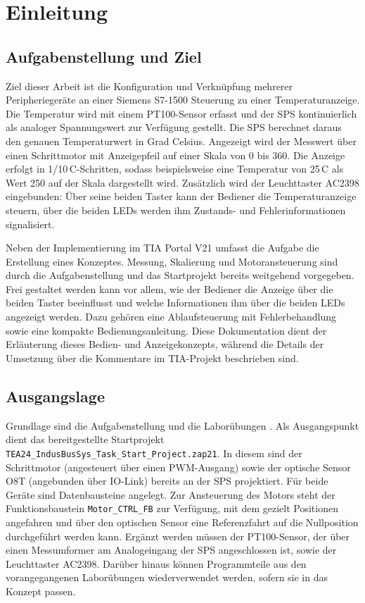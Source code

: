 \section{Einleitung}

\subsection{Aufgabenstellung und Ziel}
Ziel dieser Arbeit ist die Konfiguration und Verknüpfung mehrerer Peripheriegeräte an einer Siemens S7-1500 Steuerung zu einer Temperaturanzeige. 
Die Temperatur wird mit einem PT100-Sensor erfasst und der SPS kontinuierlich als analoger Spannungswert zur Verfügung gestellt. Die SPS berechnet daraus den genauen Temperaturwert in Grad Celsius. 
Angezeigt wird der Messwert über einen Schrittmotor mit Anzeigepfeil auf einer Skala von 0 bis 360. 
Die Anzeige erfolgt in 1/10\,\textdegree C-Schritten, sodass beispielsweise eine Temperatur von 25\,\textdegree C als Wert 250 auf der Skala dargestellt wird. 
Zusätzlich wird der Leuchttaster AC2398 eingebunden: Über seine beiden Taster kann der Bediener die Temperaturanzeige steuern, über die beiden LEDs werden ihm Zustands- und Fehlerinformationen signalisiert.

Neben der Implementierung im TIA Portal V21 umfasst die Aufgabe die Erstellung eines Konzeptes. 
Messung, Skalierung und Motoransteuerung sind durch die Aufgabenstellung und das Startprojekt bereits weitgehend vorgegeben. 
Frei gestaltet werden kann vor allem, wie der Bediener die Anzeige über die beiden Taster beeinflusst und welche Informationen ihm über die beiden LEDs angezeigt werden. 
Dazu gehören eine Ablaufsteuerung mit Fehlerbehandlung sowie eine kompakte Bedienungsanleitung. 
Diese Dokumentation dient der Erläuterung dieses Bedien- und Anzeigekonzepts, während die Details der Umsetzung über die Kommentare im TIA-Projekt beschrieben sind.

\subsection{Ausgangslage}
Grundlage sind die Aufgabenstellung \cite{aufgabe_tea24} und die Laborübungen \cite{lab_part1,lab_part2,lab_part3}. Als Ausgangspunkt dient das bereitgestellte Startprojekt \texttt{TEA24\_IndusBusSys\_Task\_Start\_Project.zap21}. 
In diesem sind der Schrittmotor (angesteuert über einen PWM-Ausgang) sowie der optische Sensor O8T (angebunden über IO-Link) bereits an der SPS projektiert. 
Für beide Geräte sind Datenbausteine angelegt. 
Zur Ansteuerung des Motors steht der Funktionsbaustein \texttt{Motor\_CTRL\_FB} zur Verfügung, mit dem gezielt Positionen angefahren und über den optischen Sensor eine Referenzfahrt auf die Nullposition durchgeführt werden kann. 
Ergänzt werden müssen der PT100-Sensor, der über einen Messumformer am Analogeingang der SPS angeschlossen ist, sowie der Leuchttaster AC2398. 
Darüber hinaus können Programmteile aus den vorangegangenen Laborübungen wiederverwendet werden, sofern sie in das Konzept passen.
